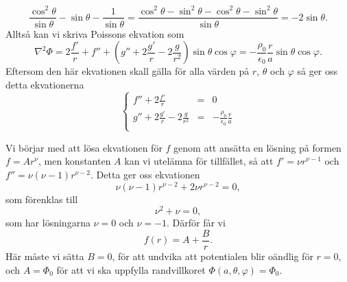 \documentclass[%
oneside,                 %
final,                   %
10pt]{article}
\newenvironment{doconceexercise}{}{}
\begin{document}
\begin{doconceexercise}
\begin{equation}
  \frac{\cos^2 \theta}{\sin \theta} - \sin \theta - \frac{1}{\sin \theta} =
\frac{\cos^2 \theta - \sin^2 \theta - \cos^2 \theta - \sin^2 \theta}
{\sin \theta} = -2 \sin \theta.
\end{equation}
Alltså kan vi skriva Poissons ekvation som
\begin{equation}
  \nabla^2 \Phi = 2 \frac{f'}{r} + f'' + \left(g'' + 2 \frac{g'}{r} - 
2\frac{g}{r^2}\right) \sin \theta \cos \varphi = - \frac{\rho_0}{\epsilon_0}
\frac{r}{a} \sin \theta \cos \varphi.
\end{equation}
Eftersom den här ekvationen skall gälla för alla värden på $r$, $\theta$
och $\varphi$ så ger oss detta ekvationerna
\begin{equation}
  \left\{ \begin{array}{lcl}
f'' + 2\frac{f'}{r} & = & 0\\
g'' + 2 \frac{g'}{r} - 2\frac{g}{r^2} & = & - \frac{\rho_0}{\epsilon_0} 
\frac{r}{a}\\
\end{array}\right.
\end{equation}

Vi börjar med att lösa ekvationen för $f$ genom att ansätta en 
lösning på formen $f =A r^\nu$, men konstanten $A$ kan vi utelämna
för tillfället, så att $f' = \nu r^{\nu-1}$ och
$f'' = \nu (\nu-1) r^{\nu-2}$.  Detta ger oss ekvationen
\begin{equation}
  \nu \left(\nu-1\right) r^{\nu-2}+2\nu r^{\nu-2} = 0,
\end{equation}
som förenklas till
\begin{equation}
  \nu^2 + \nu = 0,
\end{equation}
som har lösningarna $\nu = 0$ och $\nu = -1$.  Därför får vi
\begin{equation}
  f\left(r\right) = A + \frac{B}{r}.
\end{equation}
Här måste vi sätta $B = 0$, för att undvika att potentialen blir
oändlig för $r = 0$, och $A = \Phi_0$ för att vi ska uppfylla 
randvillkoret $\Phi(a,\theta,\varphi) = \Phi_0$.


\end{doconceexercise}
\end{document}
